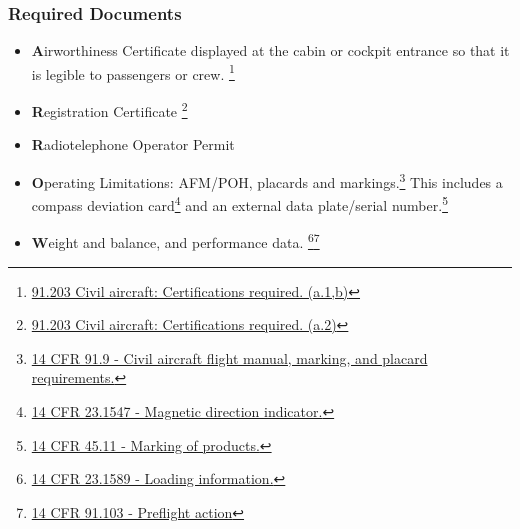 \documentclass[12pt]{article}
\begin{document}
		\subsubsection{Required Documents}
			\begin{itemize}
				\item \textbf{A}irworthiness Certificate displayed at the cabin or cockpit entrance so that it is legible to passengers or crew. \footnote{\href{https://www.law.cornell.edu/cfr/text/14/91.203}{91.203 Civil aircraft: Certifications required. (a.1,b)}}
				\item \textbf{R}egistration Certificate \footnote{\href{https://www.law.cornell.edu/cfr/text/14/91.203}{91.203 Civil aircraft: Certifications required. (a.2)}}
				\item \textbf{R}adiotelephone Operator Permit
				\item \textbf{O}perating Limitations: AFM/POH, placards and markings.\footnote{\href{https://www.law.cornell.edu/cfr/text/14/91.9}{14 CFR 91.9 - Civil aircraft flight manual, marking, and placard requirements.}} This includes a compass deviation card\footnote{\href{https://www.law.cornell.edu/cfr/text/14/23.1547}{14 CFR 23.1547 - Magnetic direction indicator.}} and an external data plate/serial number.\footnote{\href{https://www.law.cornell.edu/cfr/text/14/45.11}{14 CFR 45.11 - Marking of products.}}
				\item \textbf{W}eight and balance, and performance data. \footnote{\href{https://www.law.cornell.edu/cfr/text/14/23.1589}{14 CFR 23.1589 - Loading information.}}\footnote{\href{https://www.law.cornell.edu/cfr/text/14/91.103}{14 CFR 91.103 - Preflight action}}
			\end{itemize}
\end{document}
